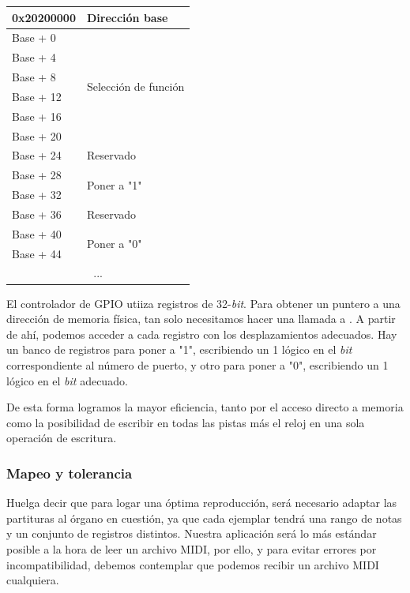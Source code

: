 \smallskip

\begin{center}
	\begin{tabular}{|l|l|}
		\hline 0x20200000 & Dirección base \\
		\hline
		\hline Base + 0 & \multirow{6}{*}{Selección de función} \\
		\cline{1-1} Base + 4 & \\
		\cline{1-1} Base + 8 & \\
		\cline{1-1} Base + 12 & \\
		\cline{1-1} Base + 16 & \\
		\cline{1-1} Base + 20 & \\
		\hline Base + 24 & Reservado \\
		\hline Base + 28 & \multirow{2}{*}{Poner a "1"} \\
		\cline{1-1} Base + 32 & \\
		\hline Base + 36 & Reservado \\
		\hline Base + 40 & \multirow{2}{*}{Poner a "0"} \\
		\cline{1-1} Base + 44 & \\
		\hline \multicolumn{2}{|c|}{...} \\
		\hline 
	\end{tabular}
	\smallskip
\end{center}

\smallskip

El controlador de \acrshort{GPIO} utiiza registros de 32-\textit{bit}. Para obtener un puntero a una dirección de memoria física, tan solo necesitamos hacer una llamada a  \cite{soii}. A partir de ahí, podemos acceder a cada registro con los desplazamientos adecuados. Hay un banco de registros para poner a "1", escribiendo un 1 lógico en el \textit{bit} correspondiente al número de puerto, y otro para poner a "0", escribiendo un 1 lógico en el \textit{bit} adecuado.

De esta forma logramos la mayor eficiencia, tanto por el acceso directo a memoria como la posibilidad de escribir en todas las pistas más el reloj en una sola operación de escritura.

\subsubsection{Mapeo y tolerancia}

Huelga decir que para logar una óptima reproducción, será necesario adaptar las partituras al órgano en cuestión, ya que cada ejemplar tendrá una rango de notas y un conjunto de registros distintos. Nuestra aplicación será lo más estándar posible a la hora de leer un archivo \acrshort{MIDI}, por ello, y para evitar errores por incompatibilidad, debemos contemplar que podemos recibir un archivo \acrshort{MIDI} cualquiera.


